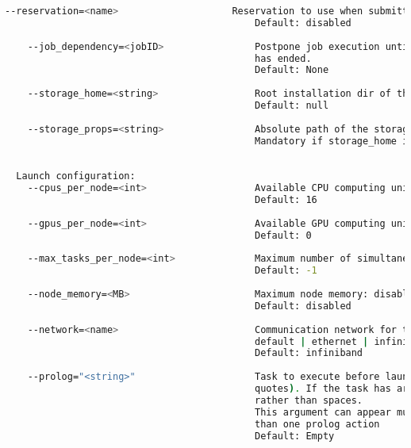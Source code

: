 \begin{lstlisting}[language=bash]
    --reservation=<name>                    Reservation to use when submitting the job. 
                                            Default: disabled
                                            
    --job_dependency=<jobID>                Postpone job execution until the job dependency 
                                            has ended.
                                            Default: None
                                            
    --storage_home=<string>                 Root installation dir of the storage implementation
                                            Default: null
                                            
    --storage_props=<string>                Absolute path of the storage properties file
                                            Mandatory if storage_home is defined
                                            
                                            
  Launch configuration:
    --cpus_per_node=<int>                   Available CPU computing units on each node
                                            Default: 16
                                            
    --gpus_per_node=<int>                   Available GPU computing units on each node
                                            Default: 0
                                            
    --max_tasks_per_node=<int>              Maximum number of simultaneous tasks running on a node
                                            Default: -1
                                            
    --node_memory=<MB>                      Maximum node memory: disabled | <int> (MB)
                                            Default: disabled
                                            
    --network=<name>                        Communication network for transfers: 
                                            default | ethernet | infiniband | data.
                                            Default: infiniband
                                              
    --prolog="<string>"                     Task to execute before launching COMPSs (Notice the
                                            quotes). If the task has arguments split them by ","
                                            rather than spaces. 
                                            This argument can appear multiple times for more 
                                            than one prolog action
                                            Default: Empty
                                            

\end{lstlisting}
